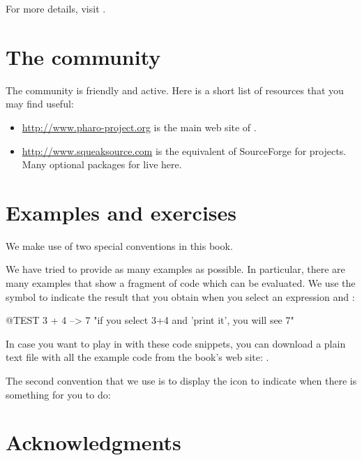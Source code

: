 \documentclass[a4paper,10pt,twoside]{book}
\begin{document}
For more details, visit \pbe.

\section*{The \pharo community}

The \pharo community is friendly and active.
Here is a short list of resources that you may find useful:

\begin{itemize}
\item \url{http://www.pharo-project.org} is the main web site of \pharo.

\item \url{http://www.squeaksource.com} is the equivalent of SourceForge for \pharo projects.
Many optional packages for \pharo live here.
\end{itemize}

\section*{Examples and exercises}

We make use of two special conventions in this book.

We have tried to provide as many examples as possible.
In particular, there are many examples that show a fragment of code which can be evaluated.  We use the symbol \ct{-->} to indicate the result that you obtain when you select an expression and :

\begin{code}{@TEST}
3 + 4 --> 7    "if you select 3+4 and 'print it', you will see 7"
\end{code}

In case you want to play in \pharo with these code snippets, you can download a plain text file with all the example code from the book's web site: \pbe.

The second convention that we use is to display the icon \dothisicon{} to indicate when there is something for you to do:


\section*{Acknowledgments}
\end{document}
